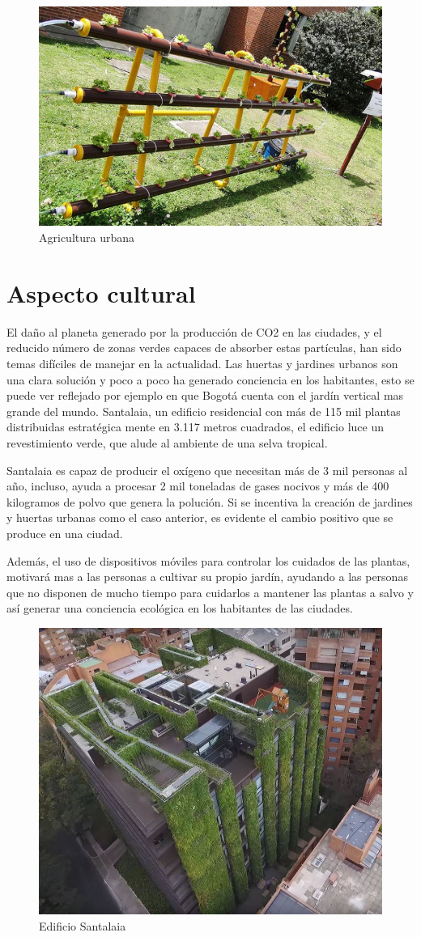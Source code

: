 \begin{figure}[th!]
	\centering
	\includegraphics[width=0.7\linewidth]{proyecto/imgs/ag1}
	\caption{Agricultura urbana}
	\label{fig:rup}
\end{figure}

\section{Aspecto cultural}
El daño al planeta generado por la producción de CO2 en las ciudades, y el reducido número de zonas verdes capaces de absorber estas partículas, han sido temas difíciles de manejar en la actualidad. Las huertas y jardines urbanos son una clara solución y poco a poco ha generado conciencia en los habitantes, esto se puede ver reflejado por ejemplo en que Bogotá cuenta con el jardín vertical mas grande del mundo. Santalaia, un edificio residencial con más de 115 mil plantas distribuidas estratégica mente en 3.117 metros cuadrados, el edificio luce un revestimiento verde, que alude al ambiente de una selva tropical.

Santalaia es capaz de producir el oxígeno que necesitan más de 3 mil personas al año, incluso, ayuda a procesar 2 mil toneladas de gases nocivos y más de 400 kilogramos de polvo que genera la polución. Si se incentiva la creación de jardines y huertas urbanas como el caso anterior, es evidente el cambio positivo que se produce en una ciudad. 

Además, el uso de dispositivos móviles para controlar los cuidados de las plantas, motivará mas a las personas a cultivar su propio jardín, ayudando a las personas que no disponen de mucho tiempo para cuidarlos a mantener las plantas a salvo y así generar una conciencia ecológica en los habitantes de las ciudades.

\begin{figure}[th!]
	\centering
	\includegraphics[width=0.7\linewidth]{proyecto/imgs/cultu}
	\caption{Edificio Santalaia}
	\label{fig:rup}
\end{figure}
